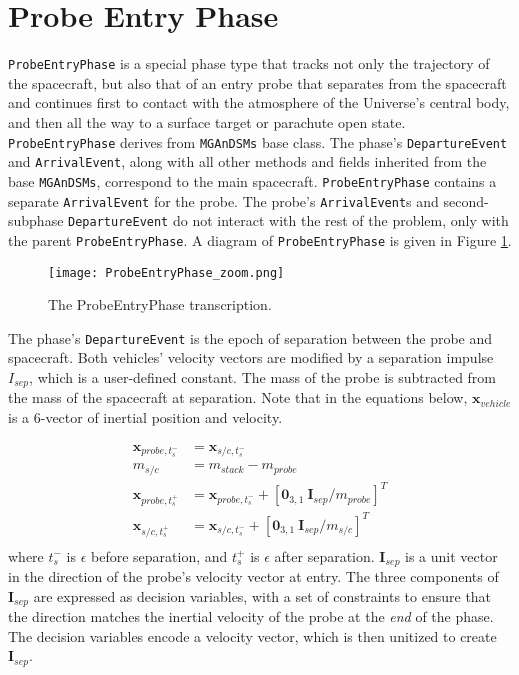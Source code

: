 \section{Probe Entry Phase}
\label{sec:ProbeEntryPhase}
\texttt{ProbeEntryPhase} is a special phase type that tracks not only the trajectory of the spacecraft, but also that of an entry probe that separates from the spacecraft and continues first to contact with the atmosphere of the Universe's central body, and then all the way to a surface target or parachute open state. \texttt{ProbeEntryPhase} derives from  \texttt{MGAnDSMs} base class. The phase's \texttt{DepartureEvent} and \texttt{ArrivalEvent}, along with all other methods and fields inherited from the base \texttt{MGAnDSMs}, correspond to the main spacecraft. \texttt{ProbeEntryPhase} contains a separate \texttt{ArrivalEvent} for the probe. The probe's \texttt{ArrivalEvent}s and second-subphase \texttt{DepartureEvent} do not interact with the rest of the problem, only with the parent \texttt{ProbeEntryPhase}. A diagram of \texttt{ProbeEntryPhase} is given in Figure \ref{fig:ProbeEntryPhase}.

\begin{figure}[ht]
	\centering
	\texttt{[image: ProbeEntryPhase\_zoom.png]}
	\caption{\label{fig:ProbeEntryPhase} The ProbeEntryPhase transcription.}
\end{figure}

The phase's \texttt{DepartureEvent} is the epoch of separation between the probe and spacecraft. Both vehicles' velocity vectors are modified by a separation impulse $I_{sep}$, which is a user-defined constant. The mass of the probe is subtracted from the mass of the spacecraft at separation. Note that in the equations below, $\mathbf{x}_{vehicle}$ is a 6-vector of inertial position and velocity.

\begin{align}
\mathbf{x}_{probe,t_s^-} &= \mathbf{x}_{s/c,t_s^-}\\
m_{s/c} &= m_{stack} - m_{probe}\\
\mathbf{x}_{probe,t_s^+} &= \mathbf{x}_{probe,t_s^-} + \left[\mathbf{0}_{3,1} \: \mathbf{I}_{sep}/m_{probe}\right]^T\\
\mathbf{x}_{s/c,t_s^+} &= \mathbf{x}_{s/c,t_s^-} + \left[\mathbf{0}_{3,1} \: \mathbf{I}_{sep}/m_{s/c}\right]^T\\
\end{align}
%
where $t_s^-$ is $\epsilon$ before separation, and $t_s^+$ is $\epsilon$ after separation. $\mathbf{I}_{sep}$ is a unit vector in the direction of the probe's velocity vector at entry. The three components of $\mathbf{I}_{sep}$ are expressed as decision variables, with a set of constraints to ensure that the direction matches the inertial velocity of the probe at the \textit{end} of the phase. The decision variables encode a velocity vector, which is then unitized to create $\mathbf{I}_{sep}$.

